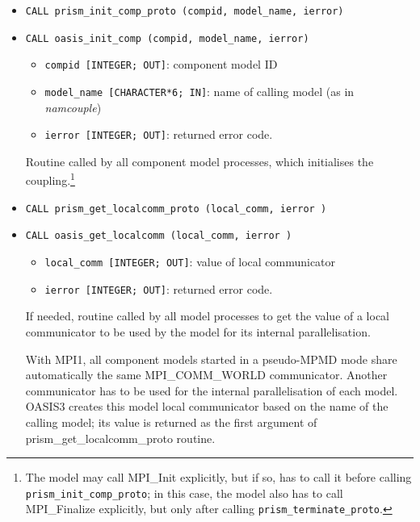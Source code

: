 \begin{itemize}

\item {\tt CALL prism\_init\_comp\_proto (compid, model\_name, ierror)} 
\item {\tt CALL oasis\_init\_comp        (compid, model\_name, ierror)} 

 \begin{itemize}
   \item {\tt compid [INTEGER; OUT]}: component model ID 
   \item {\tt model\_name [CHARACTER*6; IN]}: name of calling model (as in
  {\em namcouple}) 
   \item {\tt ierror [INTEGER; OUT]}: returned error code.
 \end{itemize}
 
Routine called by all component model processes, which initialises the
coupling.\footnote{The model may call MPI\_Init explicitly, but if so, has to
call it before calling {\tt prism\_init\_comp\_proto}; in this case, the
model also has to call MPI\_Finalize explicitly, but only after calling
{\tt prism\_terminate\_proto}.}

\item {\tt CALL prism\_get\_localcomm\_proto (local\_comm, ierror )}
\item {\tt CALL oasis\_get\_localcomm        (local\_comm, ierror )}

 \begin{itemize}
   \item {\tt local\_comm [INTEGER; OUT]}: value of local communicator
   \item {\tt ierror [INTEGER; OUT]}: returned error code.
 \end{itemize}

  If needed, routine called by all model processes  
  to get the value of a local communicator to be used by the
  model for its internal parallelisation.

  With MPI1, all component models started in a
  pseudo-MPMD mode share automatically the same MPI\_COMM\_WORLD
  communicator.  Another communicator has to be used for the internal
  parallelisation of each model. OASIS3 creates this model local
  communicator based on the name of the calling model; its value is returned
  as the first argument of prism\_get\_localcomm\_proto routine.


\end{itemize}


